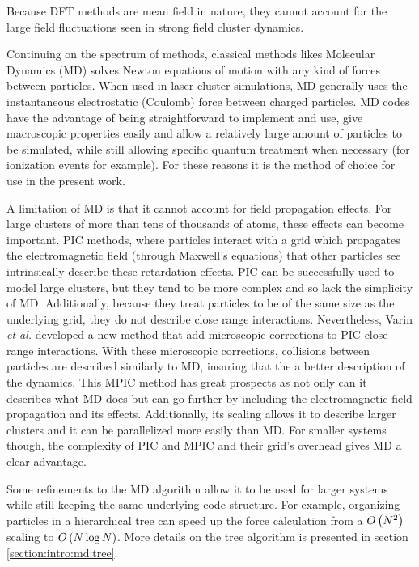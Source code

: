 Because DFT methods are mean field in nature, they cannot account for the large
field fluctuations seen in strong field cluster dynamics.

Continuing on the spectrum of methods, classical methods likes Molecular
Dynamics (MD) solves Newton
equations of motion with any kind of forces between particles\cite{Skeel1998}.
When used in
laser-cluster simulations, MD generally uses the instantaneous electrostatic
(Coulomb) force between charged particles. MD codes have the advantage of being
straightforward to implement and use, give macroscopic properties easily and allow a
relatively large amount of particles to be simulated, while still allowing
specific quantum treatment when necessary (for ionization events for example). For
these reasons it is the method of choice for use in the present work.

A limitation of MD is that it cannot account for field propagation effects. For
large clusters of more than tens of thousands of atoms, these effects can become
important. PIC methods, where particles interact with a grid which propagates the
electromagnetic field (through Maxwell's equations) that other particles see
intrinsically describe these retardation effects. PIC can be successfully used
to model large clusters, but they tend to be more complex and so lack the
simplicity of MD. Additionally, because they treat particles to be of the same
size as the underlying grid, they do not describe close range interactions.
Nevertheless, Varin \textit{et al.} developed a new method that add microscopic
corrections to PIC close range interactions\cite{Varin2012}. With these microscopic
corrections, collisions between particles are described similarly to MD, insuring
that the a better description of the dynamics. This MPIC method has great prospects
as not only can it describes what MD does but can go further by including the
electromagnetic field propagation and its effects. Additionally, its scaling
allows it to describe larger clusters and it can be parallelized more easily
than MD. For smaller systems though, the complexity of PIC and MPIC and their
grid's overhead gives MD a clear advantage.

Some refinements to the MD algorithm allow it to be used for larger systems
while still keeping the same underlying code structure. For example, organizing
particles in a hierarchical tree\cite{Barnes1986,Gibbon2002} can speed up the force
calculation from a $O\left( N^2 \right)$ scaling to $O\left( N \log{N} \right)$. More details on the
tree algorithm is presented in section \ref{section:intro:md:tree}.

